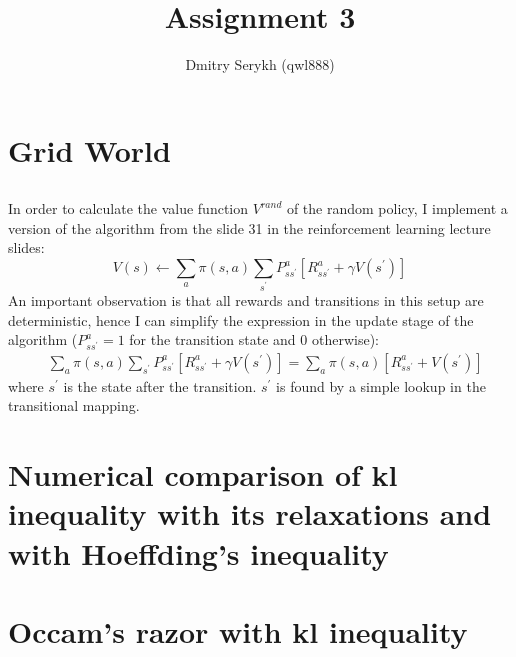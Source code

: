 \documentclass[a4paper]{article}
\title{\vspace{-5cm} Assignment 3}
\author{Dmitry Serykh (qwl888)}
\begin{document}
\maketitle


\section{Grid World}
\label{sec:1}
\subsection{}
\label{subsec:11}
In order to calculate the value function $V^{rand}$ of the random policy, I
implement a version of the algorithm from the slide 31 in the reinforcement
learning lecture slides:
$$
  V(s) \leftarrow \sum_{a} \pi(s, a)
  \sum_{s^{\prime}} P_{s s^{\prime}}^{a}\left[R_{s s^{\prime}}^{a}+\gamma
    V(s^{\prime})\right]
  $$
An important observation is that all rewards and
transitions in this setup are deterministic, hence I can simplify the expression in the update
stage of the algorithm ($P_{s s^{\prime}}^{a} = 1$ for the transition state and
0 otherwise):
\begin{align*}
  &\sum_{a} \pi(s, a) \sum_{s^{\prime}} P_{s s^{\prime}}^{a}\left[R_{s s^{\prime}}^{a}+\gamma
    V(s^{\prime})\right] = 
  \sum_{a} \pi(s, a)
  \left[R_{s s^{\prime}}^{a} + V(s^{\prime})\right]
\end{align*}
where $s^{\prime}$ is the state after the transition. $s^{\prime}$ is found
by a simple lookup in the transitional mapping.


\section{Numerical comparison of kl inequality with its relaxations and with Hoeffding’s inequality}
\section{Occam’s razor with kl inequality}
\end{document}
